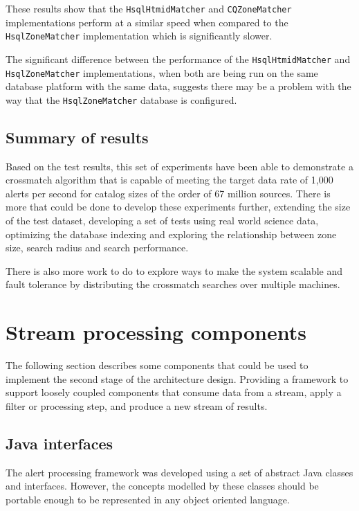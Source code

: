 \documentclass{article}
\newcommand{\crossmatch} {crossmatch\xspace}
\newcommand{\dataset} {dataset\xspace}
\newcommand{\catalog} {catalog\xspace}
\begin{document}
These results show that the \texttt{HsqlHtmidMatcher} and \texttt{CQZoneMatcher} implementations 
perform at a similar speed when compared to the \texttt{HsqlZoneMatcher} implementation which is significantly slower.

The significant difference between the performance of the \texttt{HsqlHtmidMatcher} and \texttt{HsqlZoneMatcher} implementations, when both are being run on the same database platform with the same data, suggests there may be a problem with the way that the \texttt{HsqlZoneMatcher} database is configured.

\subsection{Summary of results}
\label{crossmatch-summary}

Based on the test results, this set of experiments have been able to demonstrate a \crossmatch algorithm that is capable of meeting the target data rate of 1,000 alerts per second for \catalog sizes of the order of 67 million sources. 
There is more that could be done to develop these experiments further, extending the size of the test \dataset, developing a set of tests using real world science data, optimizing the database indexing and exploring the relationship between zone size, search radius and search performance.

There is also more work to do to explore ways to make the system scalable and fault tolerance by distributing the \crossmatch searches over multiple machines.

\section{Stream processing components}
\label{stream-processing-components}

The following section describes some components that could be used to implement the second stage of the architecture design. Providing a framework to support loosely coupled components that consume data from a stream, apply a filter or processing step, and produce a new stream of results.

\subsection{Java interfaces}
\label{component-libraries.java-interfaces}

The alert processing framework was developed using a set of abstract Java classes and interfaces. However, the concepts modelled by these classes should be portable enough to be represented in any object oriented language.
\end{document}
